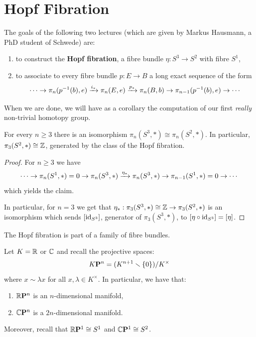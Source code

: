 
\section{Hopf Fibration}


The goals of the following two lectures (which are given by Markus Hausmann, a PhD student of Schwede) are:
\begin{enumerate}
    \item to construct the \textbf{Hopf fibration}, a fibre bundle $\eta:S^3\to S^2$ with fibre $S^1$,
    \item to associate to every fibre bundle $p:E\to B$ a long exact sequence of the form
    \[\cdots\to\pi_n(p^{-1}(b),e)\xrightarrow{i_*}\pi_n(E,e)\xrightarrow{p_*}\pi_n(B,b)\to\pi_{n-1}(p^{-1}(b),e)\to\cdots\]
\end{enumerate}

When we are done, we will have as a corollary the computation of our first \textit{really} non-trivial homotopy group.

\begin{corollary}
For every $n\geq 3$ there is an isomorphism $\pi_n(S^3,*)\cong\pi_n(S^2,*)$. In particular, $\pi_3(S^2,*)\cong{\mathbb Z}$, generated by the class of the Hopf fibration.
\end{corollary}

\begin{proof}
For $n\geq3$ we have
\[\cdots\to\pi_n(S^1,*)=0\to\pi_n(S^3,*)\xrightarrow{\eta_*}\pi_n(S^3,*)\to\pi_{n-1}(S^1,*)=0\to\cdots\]
which yields the claim.

In particular, for $n=3$ we get that $\eta_*:\pi_3(S^3,*)\cong{\mathbb Z}\to\pi_3(S^2,*)$ is an isomorphism which sends $[\operatorname{id}_{S^3}]$, generator of $\pi_3(S^3,*)$, to $[\eta\circ\operatorname{id}_{S^3}]=[\eta]$.
\end{proof}

The Hopf fibration is part of a family of fibre bundles.

Let $K={\mathbb R}$ or $\mathbb{C}$ and recall the projective spaces:
\[{K\mathbf{P}^n}=(K^{n+1}\smallsetminus\{0\})/K^\times\]
where $x\sim\lambda x$ for all $x,\lambda\in K^\times$. In particular, we have that:
\begin{enumerate}[label={-}]
    \item ${{\mathbb R}\mathbf{P}^n}$ is an $n$-dimensional manifold,
    \item ${\mathbb{C}\mathbf{P}^n}$ is a $2n$-dimensional manifold.
\end{enumerate}
Moreover, recall that ${{\mathbb R}\mathbf{P}^{1}}\cong S^1$ and ${\mathbb{C}\mathbf{P}^{1}}\cong S^2$.

